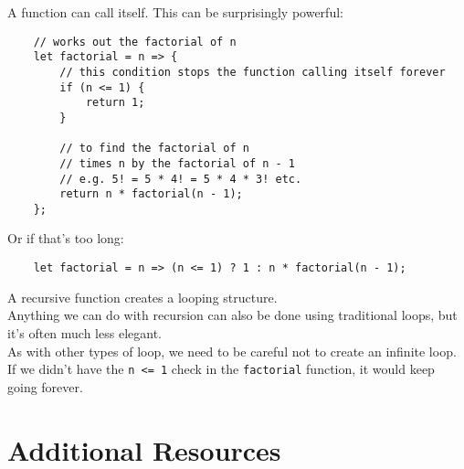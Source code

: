 
A function can call itself. This can be surprisingly powerful:

\begin{verbatim}
    // works out the factorial of n
    let factorial = n => {
        // this condition stops the function calling itself forever
        if (n <= 1) {
            return 1;
        }

        // to find the factorial of n
        // times n by the factorial of n - 1
        // e.g. 5! = 5 * 4! = 5 * 4 * 3! etc.
        return n * factorial(n - 1);
    };
\end{verbatim}

Or if that's too long:

\begin{verbatim}
    let factorial = n => (n <= 1) ? 1 : n * factorial(n - 1);
\end{verbatim}

A recursive function creates a looping structure.
\\

Anything we can do with recursion can also be done using traditional loops, but it's often much less elegant.
\\

As with other types of loop, we need to be careful not to create an infinite loop. If we didn't have the \texttt{n <= 1} check in the \texttt{factorial} function, it would keep going forever.



\section{Additional Resources}

